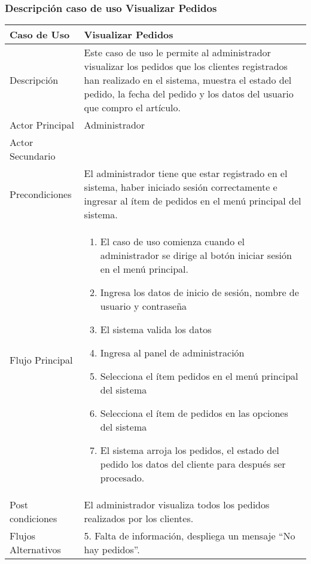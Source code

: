 \documentclass[12pt,a4paper]{article}
\begin{document}
        \newpage
\subsubsection*{Descripción caso de uso Visualizar Pedidos}
\begin{table}[h]
        \centering
        \begin{tabular}{| p{3cm}| p{11cm} |} 
        \hline  
        Caso de Uso         &    \textbf{Visualizar Pedidos }   \\ 
        \hline
        Descripción         &  Este caso de uso le permite al administrador visualizar los pedidos que los clientes registrados han realizado en el sistema, muestra el estado del pedido, la fecha del pedido y los datos del usuario que compro el artículo.     \\ 
        \hline
        Actor Principal     &  Administrador    \\ 
        \hline
        Actor Secundario    &       \\ 
        \hline
        Precondiciones      &  El administrador tiene que estar registrado en el sistema, haber iniciado sesión correctamente e ingresar al ítem de pedidos en el menú principal del sistema.   	\\
        \hline
        Flujo Principal     &    

            \begin{enumerate}
                \item El caso de uso comienza cuando el administrador se dirige al botón iniciar sesión en el menú principal.
                \item Ingresa los datos de inicio de sesión, nombre de usuario y contraseña
                \item El sistema valida los datos
                \item Ingresa al panel de administración
                \item Selecciona el ítem pedidos en el menú principal del sistema
                \item Selecciona el ítem de pedidos en las opciones del sistema
                \item El sistema arroja los pedidos, el estado del pedido los datos del cliente para después ser procesado.
            \end{enumerate}
        \\  
        \hline
        Post condiciones    &   El administrador visualiza todos los pedidos realizados por los clientes.    \\  
        \hline
        Flujos Alternativos &    5. Falta de información, despliega un mensaje “No hay pedidos”.   \\  
        \hline
        \end{tabular}
    \end{table}
\end{document}
